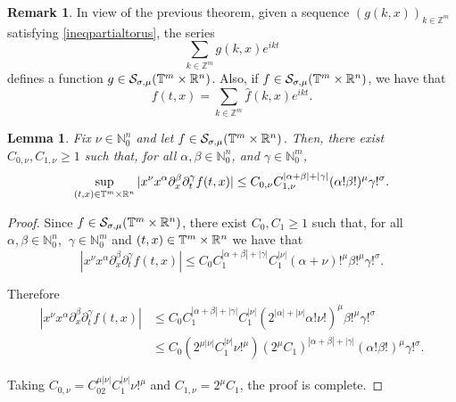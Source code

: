 \documentclass[11pt,reqno]{amsart}
\numberwithin{equation}{section}
\newtheorem{lemma}[theorem]{Lemma}
\theoremstyle{definition}
\newtheorem{obs}{Remark}
\theoremstyle{definition}
\newcommand{\G}{\mathnormal{\mathbb{T}^{m}\times\mathbb{R}^n}}
\newcommand{\Z}{\mathbb{Z}}
\newcommand{\N}{\mathbb{N}}
\renewcommand{\S}{\mathcal{S}_{\sigma,\mu}(\G)}
\begin{document}
    \begin{obs}
        In view of the previous theorem, given a sequence $(g(k,x))_{k\in\Z^m}$ satisfying \eqref{ineqpartialtorus}, the series
        \[\sum_{k\in\Z^m}g(k,x)e^{ikt}\]
        defines a function $g\in\S$. Also, if $f\in\S$, we have that
        \[f(t,x)=\sum_{k\in\Z^m}\widehat{f}(k,x)e^{ikt}.\]
    \end{obs}

    \begin{lemma}\label{lemma_poly}
        Fix $\nu\in\N_0^n$ and let $f\in\S$. Then, there exist $C_{0,\nu},C_{1,\nu}\geq 1$ such that, for all $\alpha,\beta\in\N_0^n$, and $\gamma\in\N_0^m$,
        \[\sup_{(t,x)\in\G}|x^\nu x^\alpha\partial_x^\beta\partial_t^\gamma f(t,x)|\leq C_{0,\nu} C_{1,\nu}^{|\alpha+\beta|+|\gamma|}(\alpha!\beta!)^\mu\gamma!^\sigma.\]
    \end{lemma}
    \begin{proof}
       Since $f\in\S$, there exist $C_0,C_1\geq 1$ such that, for all $\alpha,\beta\in\N_0^n$, $\ \gamma\in\N_0^m$ and $(t,x)\in\G$ we have that
        \[|x^\nu x^\alpha\partial_x^\beta\partial_t^\gamma f(t,x)|\leq C_0C_1^{|\alpha+\beta|+|\gamma|}C_1^{|\nu|}(\alpha+\nu)!^\mu\beta!^\mu\gamma!^\sigma.\]
       
       Therefore
        \begin{align*}
        |x^\nu x^\alpha\partial_x^\beta\partial_t^\gamma f(t,x)| & \leq C_0C_1^{|\alpha+\beta|+|\gamma|}C_1^{|\nu|}(2^{|\alpha|+|\nu|}\alpha!\nu!)^\mu\beta!^\mu\gamma!^\sigma\\
        & \leq  C_0(2^{\mu|\nu|}C_1^{|\nu|}\nu!^\mu)(2^\mu C_1)^{|\alpha+\beta|+|\gamma|}(\alpha!\beta!)^\mu\gamma!^\sigma.
        \end{align*}
        
        Taking $C_{0,\nu} = C_02^{\mu|\nu|}C_1^{|\nu|}\nu!^\mu$ and $C_{1,\nu}=2^\mu C_1$, the proof is complete.
    \end{proof}
\end{document}
